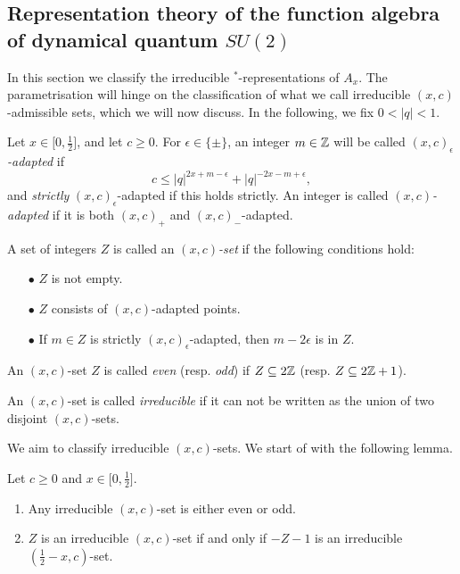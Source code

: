 \subsection{Representation theory of the function algebra of dynamical quantum $SU(2)$}


In this section we classify the irreducible $^*$-representations of $A_x$. The parametrisation will hinge on the classification of what we call irreducible $(x,c)$-admissible sets, which we will now discuss. In the following, we fix $0<|q|<1$.

\begin{Def} Let $x\in \lbrack 0,\frac{1}{2}\rbrack$, and let $c\geq 0$. For $\epsilon \in \{\pm\}$, an integer $m\in \mathbb{Z}$ will be called \emph{$(x,c)_{\epsilon}$-adapted} if \begin{equation}\label{EqAd+}c \leq |q|^{2x+m-\epsilon}+|q|^{-2x-m+\epsilon},\end{equation} and \emph{strictly} $(x,c)_{\epsilon}$-adapted if this holds strictly. An integer is called \emph{$(x,c)$-adapted} if it is both $(x,c)_+$ and $(x,c)_-$-adapted. 

A set of integers $Z$ is called an  \emph{$(x,c)$-set} if the following conditions hold: \begin{itemize} 
\item[$\bullet$] $Z$ is not empty.
\item[$\bullet$] $Z$ consists of $(x,c)$-adapted points.
\item[$\bullet$] If $m\in Z$ is strictly $(x,c)_{\epsilon}$-adapted, then $m-2\epsilon$ is in $Z$.
\end{itemize}
An $(x,c)$-set $Z$ is called \emph{even} (resp. \emph{odd}) if $Z\subseteq 2\mathbb{Z}$ (resp. $Z\subseteq 2\mathbb{Z}+1$).

An $(x,c)$-set is called \emph{irreducible} if it can not be written as the union of two disjoint $(x,c)$-sets.
\end{Def}


We aim to classify irreducible $(x,c)$-sets. We start of with the following lemma.

\begin{Lem} Let $c\geq 0$ and $x\in \lbrack 0,\frac{1}{2}\rbrack$.
\begin{enumerate} \item Any irreducible $(x,c)$-set is either even or odd.
\item $Z$ is an irreducible $(x,c)$-set if and only if $-Z-1$ is an irreducible $(\frac{1}{2}-x,c)$-set.
\end{enumerate}
\end{Lem}

